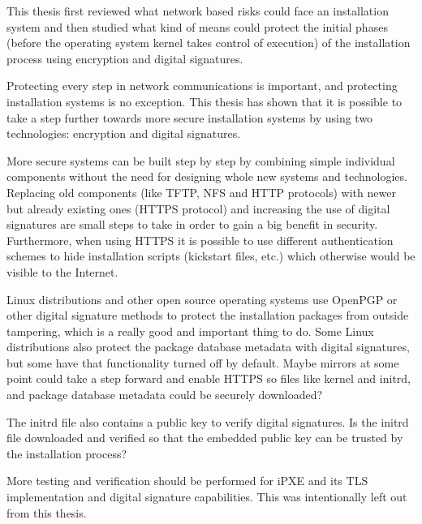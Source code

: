 
This thesis first reviewed what network based risks could face an
installation system and then studied what kind of means could protect
the initial phases (before the operating system kernel takes control
of execution) of the installation process using encryption and digital
signatures.

Protecting every step in network communications is important, and
protecting installation systems is no exception. This thesis has shown
that it is possible to take a step further towards more secure
installation systems by using two technologies: encryption and digital
signatures.

More secure systems can be built step by step by combining simple
individual components without the need for designing whole new systems
and technologies. Replacing old components (like TFTP, NFS and HTTP
protocols) with newer but already existing ones (HTTPS protocol) and
increasing the use of digital signatures are small steps to take in
order to gain a big benefit in security. Furthermore, when using HTTPS
it is possible to use different authentication schemes to hide
installation scripts (kickstart files, etc.) which otherwise would be
visible to the Internet.

Linux distributions and other open source operating systems use
OpenPGP or other digital signature methods to protect the installation
packages from outside tampering, which is a really good and important
thing to do. Some Linux distributions also protect the package
database metadata with digital signatures, but some have that
functionality turned off by default. Maybe mirrors at some point could
take a step forward and enable HTTPS so files like kernel and initrd,
and package database metadata could be securely downloaded?

The initrd file also contains a public key to verify digital
signatures. Is the initrd file downloaded and verified so that the
embedded public key can be trusted by the installation process?

More testing and verification should be performed for iPXE and
its TLS implementation and digital signature capabilities. This was
intentionally left out from this thesis.
